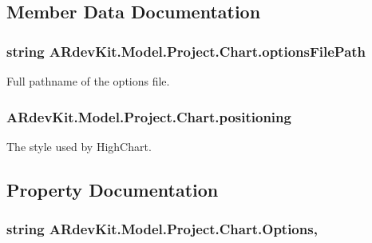 \subsection{Member Data Documentation}
\hypertarget{class_a_rdev_kit_1_1_model_1_1_project_1_1_chart_aaf91a6b3628dd8bc5e1717c1fada4f49}{
\subsubsection[{options\-File\-Path}]{\setlength{\rightskip}{0pt plus 5cm}string A\-Rdev\-Kit.\-Model.\-Project.\-Chart.\-options\-File\-Path\hspace{0.3cm}{\ttfamily [protected]}}}\label{class_a_rdev_kit_1_1_model_1_1_project_1_1_chart_aaf91a6b3628dd8bc5e1717c1fada4f49}


Full pathname of the options file. 

\hypertarget{class_a_rdev_kit_1_1_model_1_1_project_1_1_chart_a7b0dcd7f24610f6a7eb747628ee47430}{
\subsubsection[{positioning}]{ A\-Rdev\-Kit.\-Model.\-Project.\-Chart.\-positioning\hspace{0.3cm}{\ttfamily [protected]}}}\label{class_a_rdev_kit_1_1_model_1_1_project_1_1_chart_a7b0dcd7f24610f6a7eb747628ee47430}


The style used by High\-Chart. 



\subsection{Property Documentation}
\hypertarget{class_a_rdev_kit_1_1_model_1_1_project_1_1_chart_ad53af854e1106059d97d0845a6fece6d}{
\subsubsection[{Options}]{\setlength{\rightskip}{0pt plus 5cm}string A\-Rdev\-Kit.\-Model.\-Project.\-Chart.\-Options\hspace{0.3cm}{\ttfamily [get]}, {\ttfamily [set]}}}\label{class_a_rdev_kit_1_1_model_1_1_project_1_1_chart_ad53af854e1106059d97d0845a6fece6d}



